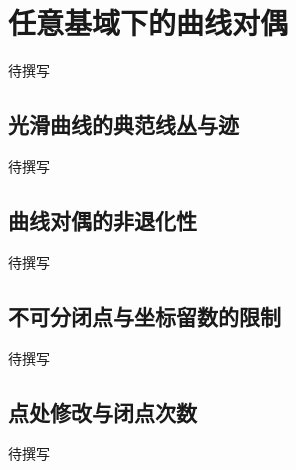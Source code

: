 
% 
% 
% 
% 
% 
% 
% 
% 
% 
% 

\section{任意基域下的曲线对偶}
\label{g5:sec:2304}

待撰写

\subsection{光滑曲线的典范线丛与迹}
\label{g5:subsec:2304:01}
待撰写

\subsection{曲线对偶的非退化性}
\label{g5:subsec:2304:02}
待撰写

\subsection{不可分闭点与坐标留数的限制}
\label{g5:subsec:2304:03}
待撰写

\subsection{点处修改与闭点次数}
\label{g5:subsec:2304:04}
待撰写
